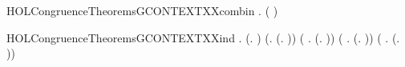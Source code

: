 \newcommand{\HOLCongruenceTheoremsGCONTEXTXXcases}{\UseVerbatim{HOLCongruenceTheoremsGCONTEXTXXcases}}
\begin{SaveVerbatim}{HOLCongruenceTheoremsGCONTEXTXXcombin}
\HOLTokenTurnstile{} \HOLSymConst{\HOLTokenForall{}} .   \HOLSymConst{\HOLTokenConj{}}   \HOLSymConst{\HOLTokenImp{}}  ( \HOLConst{\HOLTokenCompose} )
\end{SaveVerbatim}
\newcommand{\HOLCongruenceTheoremsGCONTEXTXXcombin}{\UseVerbatim{HOLCongruenceTheoremsGCONTEXTXXcombin}}
\begin{SaveVerbatim}{HOLCongruenceTheoremsGCONTEXTXXind}
\HOLTokenTurnstile{} \HOLSymConst{\HOLTokenForall{}}.
        (\HOLTokenLambda{}. ) \HOLSymConst{\HOLTokenConj{}} (\HOLSymConst{\HOLTokenForall{}}.  (\HOLTokenLambda{}. )) \HOLSymConst{\HOLTokenConj{}}
       (\HOLSymConst{\HOLTokenForall{}} .   \HOLSymConst{\HOLTokenImp{}}  (\HOLTokenLambda{}.  )) \HOLSymConst{\HOLTokenConj{}}
       (\HOLSymConst{\HOLTokenForall{}}   .
              \HOLSymConst{\HOLTokenConj{}}   \HOLSymConst{\HOLTokenImp{}}
             (\HOLTokenLambda{}.   \HOLSymConst{\ensuremath{+}}  )) \HOLSymConst{\HOLTokenConj{}}
       (\HOLSymConst{\HOLTokenForall{}} .
              \HOLSymConst{\HOLTokenConj{}}   \HOLSymConst{\HOLTokenImp{}}
             (\HOLTokenLambda{}.   \HOLSymConst{\ensuremath{\parallel}}  )) \HOLSymConst{\HOLTokenConj{}}

\end{SaveVerbatim}
